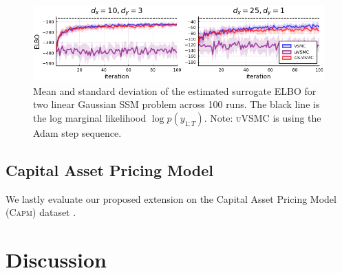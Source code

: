 \documentclass[12pt]{article}
\newcommand{\uvsmc}{\textsc{uVSMC}\xspace}
\newcommand{\elbo}{\textsc{ELBO}\xspace}
\newcommand{\ssm}{\textsc{SSM}\xspace}
\newcommand{\capm}{\textsc{Capm}\xspace}
\begin{document}
\begin{figure}[t]
\centering
\includegraphics[width=\textwidth]{figures/lgss_elbo.png}
\caption{Mean and standard deviation of the estimated surrogate \elbo for two linear Gaussian \ssm problem across 100 runs. The black line is the log marginal likelihood $\log p(y_{1:T})$. Note: \uvsmc is using the Adam step sequence.}
\label{fig:lgss_elbo}
\end{figure}

\subsection{Capital Asset Pricing Model}

We lastly evaluate our proposed extension on the Capital Asset Pricing Model (\capm) dataset \parencite{Verbeek:2004}.


\section{Discussion}\label{sec:discussion}




\newpage

\printbibliography
\end{document}
